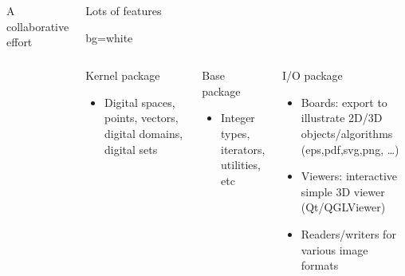 \documentclass[noamsthm, pdftex, french]{beamer}
\begin{document}
\begin{frame}
\begin{columns}
\begin{block}{A collaborative effort}
\begin{center}
      \end{center}
    \end{block}
    
    
    

    \begin{alertblock}{\centering Lots of features}
      
      
      \begin{beamercolorbox}{bg=white}
        \begin{columns}[onlytextwidth]
          
          
          \begin{block}{Kernel package}
            \begin{itemize}
            \item Digital spaces, points, vectors, digital domains, digital sets
            \end{itemize}
          \end{block}
          
        \begin{block}{Base package}
          \begin{itemize}
          \item Integer types, iterators, utilities, etc
          \end{itemize}
        \end{block}
        
        \begin{block}{I/O package}
          \begin{itemize}
          \item Boards: export to illustrate 2D/3D objects/algorithms (eps,pdf,svg,png, \ldots)
          \item Viewers: interactive simple 3D viewer (Qt/QGLViewer)
          \item Readers/writers for various image formats
          \end{itemize}
        \end{block}
        
          

\end{columns}
\end{beamercolorbox}
\end{alertblock}
\end{columns}
\end{frame}
\end{document}
